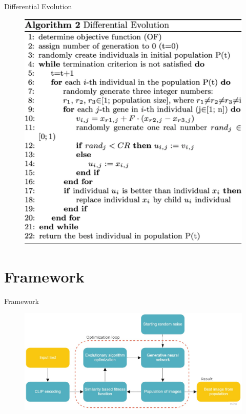 \documentclass[t]{beamer}
\begin{document}
\begin{frame}
\begin{block}{Differential Evolution}
 \begin{figure}[ht!]
     \centering
     \includegraphics[scale=0.2]{diff-evo.eps}
 \end{figure}
\end{block}
\end{frame}

\section{Framework}

\begin{frame}{Framework}
\begin{figure}[ht!]
    \centering
    \includegraphics[scale=0.2]{framework.jpg}
\end{figure} 
\end{frame}
\end{document}
